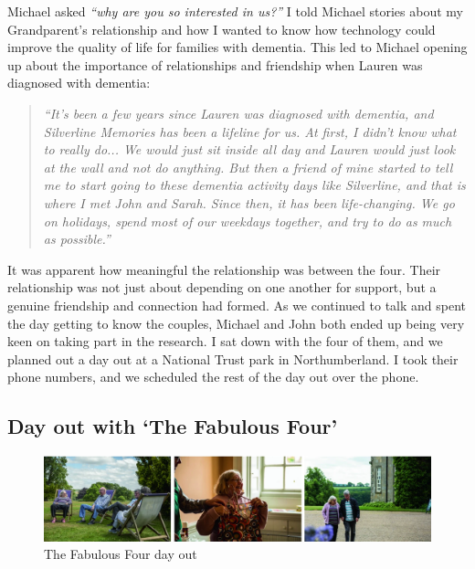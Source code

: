 Michael asked \textit{``why are you so interested in us?''} I told Michael stories about my Grandparent's relationship and how I wanted to know how technology could improve the quality of life for families with dementia. This led to Michael  opening up about the importance of relationships and friendship when Lauren was diagnosed with dementia:

\begin{quote}
\textit{``It's been a few years since Lauren was diagnosed with dementia, and Silverline Memories has been a lifeline for us. At first, I didn't know what to really do... We would just sit inside all day and Lauren would just look at the wall and not do anything. But then a friend of mine started to tell me to start going to these dementia activity days like Silverline, and that is where I met John and Sarah. Since then, it has been life-changing. We go on holidays, spend most of our weekdays together, and try to do as much as possible.''
}    
\end{quote}

It was apparent how meaningful the relationship was between the four. Their relationship was not just about depending on one another for support, but a genuine friendship and connection had formed. As we continued to talk and spent the day getting to know the couples, Michael and John both ended up being very keen on taking part in the research. I sat down with the four of them, and we planned out a day out at a National Trust park in Northumberland. I took their phone numbers, and we scheduled the rest of the day out over the phone.

\subsection{Day out with `The Fabulous Four'}
\label{DayOutOne}

\begin{figure}[htp]
\centering
\includegraphics[width=1\linewidth]{Images/ChapterFour/FamilyDayOut.png}
\caption{The Fabulous Four day out}
\label{fig:DayOut}
\end{figure}


